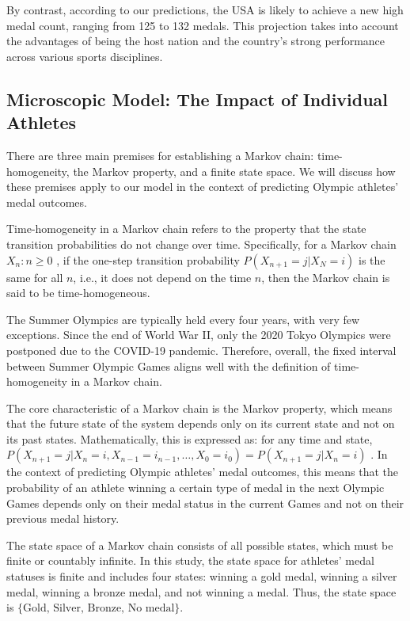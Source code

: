 \documentclass[12pt]{article}
\begin{document}
By contrast, according to our predictions, the USA is likely to achieve a new high medal count, ranging from 125 to 132 medals. This projection takes into account the advantages of being the host nation and the country's strong performance across various sports disciplines.

\subsection{Microscopic Model: The Impact of Individual Athletes}

There are three main premises for establishing a Markov chain: time-homogeneity, the Markov property, and a finite state space. We will discuss how these premises apply to our model in the context of predicting Olympic athletes' medal outcomes.

Time-homogeneity in a Markov chain refers to the property that the state transition probabilities do not change over time. Specifically, for a Markov chain ${X_n:n \geq 0}$ , if the one-step transition probability ${P(X_{n+1} = j | X_N = i)}$ is the same for all $n$, i.e., it does not depend on the time $n$, then the Markov chain is said to be time-homogeneous.

The Summer Olympics are typically held every four years, with very few exceptions. Since the end of World War II, only the 2020 Tokyo Olympics were postponed due to the COVID-19 pandemic. Therefore, overall, the fixed interval between Summer Olympic Games aligns well with the definition of time-homogeneity in a Markov chain.

The core characteristic of a Markov chain is the Markov property, which means that the future state of the system depends only on its current state and not on its past states. Mathematically, this is expressed as: for any time and state, ${P(X_{n+1} = j | X_n = i, X_{n-1} = i_{n-1}, \ldots, X_0 = i_0) = P(X_{n+1} = j | X_n = i)}$ . In the context of predicting Olympic athletes' medal outcomes, this means that the probability of an athlete winning a certain type of medal in the next Olympic Games depends only on their medal status in the current Games and not on their previous medal history.

The state space of a Markov chain consists of all possible states, which must be finite or countably infinite. In this study, the state space for athletes' medal statuses is finite and includes four states: winning a gold medal, winning a silver medal, winning a bronze medal, and not winning a medal. Thus, the state space is ${\text{\{Gold, Silver, Bronze, No medal\}}}$.
\end{document}
